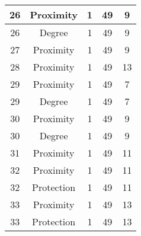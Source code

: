 \documentclass[results.tex]{subfiles}
\begin{document}
\begin{center}
\begin{tabular}{| c || c | c | c | c |}
            \hline
            26                      & Proximity                    & 1                      & 49                      & 9                    \\
            \hline
            26                      & Degree                       & 1                      & 49                      & 9                    \\
            \hline
            27                      & Proximity                    & 1                      & 49                      & 9                    \\
            \hline
            28                      & Proximity                    & 1                      & 49                      & 13                   \\
            \hline
            29                      & Proximity                    & 1                      & 49                      & 7                    \\
            \hline
            29                      & Degree                       & 1                      & 49                      & 7                    \\
            \hline
            30                      & Proximity                    & 1                      & 49                      & 9                    \\
            \hline
            30                      & Degree                       & 1                      & 49                      & 9                    \\
            \hline
            31                      & Proximity                    & 1                      & 49                      & 11                   \\
            \hline
            32                      & Proximity                    & 1                      & 49                      & 11                   \\
            \hline
            32                      & Protection                   & 1                      & 49                      & 11                   \\
            \hline
            33                      & Proximity                    & 1                      & 49                      & 13                   \\
            \hline
            33                      & Protection                   & 1                      & 49                      & 13                   \\

\end{tabular}
\end{center}
\end{document}

